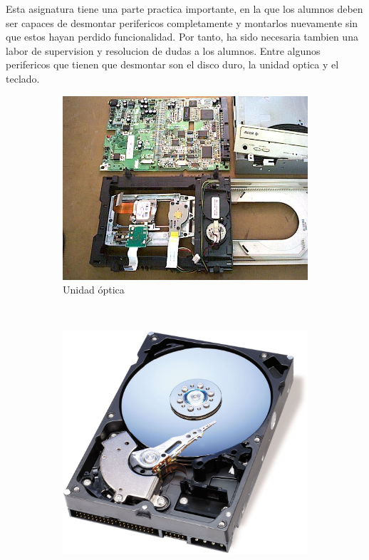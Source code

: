 \documentclass[spanish,12pt, a4paper,twoside]{paper}
\begin{document}
\justify
Esta asignatura tiene una parte practica importante, en la que los alumnos deben ser capaces de desmontar perifericos completamente y montarlos nuevamente sin que estos hayan perdido funcionalidad. Por tanto, ha sido necesaria tambien una labor de supervision y resolucion de dudas a los alumnos. Entre algunos perifericos que tienen que desmontar son el disco duro, la unidad optica y el teclado.

\begin{figure}
    \centering
    \begin{subfigure}[b]{0.3\textwidth}
        \includegraphics[width=\textwidth]{recursos/cdrom2.jpg}
        \caption{Unidad óptica}
    \end{subfigure}
    ~ %
    \begin{subfigure}[b]{0.3\textwidth}
        \includegraphics[width=\textwidth]{recursos/disco-duro.jpg}

\end{subfigure}
\end{figure}
\end{document}
